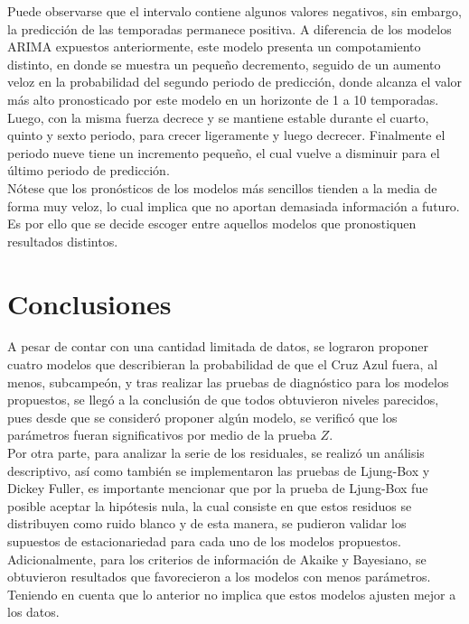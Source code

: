 \documentclass{article}
\theoremstyle{remark}
\begin{document}
Puede observarse que el intervalo contiene algunos valores negativos, sin embargo, la predicción de las temporadas permanece positiva. A diferencia de los modelos ARIMA expuestos anteriormente, este modelo presenta un compotamiento distinto, en donde se muestra un pequeño decremento, seguido de un aumento veloz en la probabilidad del segundo periodo de predicción, donde alcanza el valor más alto pronosticado por este modelo en un horizonte de 1 a 10 temporadas. Luego, con la misma fuerza decrece y se mantiene estable durante el cuarto, quinto y sexto periodo, para crecer ligeramente y luego decrecer. Finalmente el periodo nueve tiene un incremento pequeño, el cual vuelve a disminuir para el último periodo de predicción.\\

Nótese que los pronósticos de los modelos más sencillos tienden a la media de forma muy veloz, lo cual implica que no aportan demasiada información a futuro. Es por ello que se decide escoger entre aquellos modelos que pronostiquen resultados distintos.

\section{Conclusiones}
A pesar de contar con una cantidad limitada de datos, se lograron proponer cuatro modelos que describieran la probabilidad de que el Cruz Azul fuera, al menos, subcampeón, y  tras realizar las pruebas de diagnóstico para los modelos propuestos, se llegó a la conclusión de que todos obtuvieron niveles parecidos, pues desde que se consideró proponer algún modelo, se verificó que los parámetros fueran significativos  por medio de la prueba $Z$. \\

Por otra parte, para analizar la serie de los residuales, se realizó un análisis descriptivo, así como también se implementaron las pruebas de Ljung-Box y Dickey Fuller, es importante mencionar que por la prueba de Ljung-Box fue posible aceptar la hipótesis nula, la cual consiste en que estos residuos se distribuyen como ruido blanco y de esta manera, se pudieron validar los supuestos de estacionariedad para cada uno de los modelos propuestos.\\

Adicionalmente, para los criterios de información de Akaike y Bayesiano, se obtuvieron resultados que favorecieron a los modelos con menos parámetros. Teniendo en cuenta que lo anterior no implica que estos modelos ajusten mejor a los datos.\\
\end{document}
